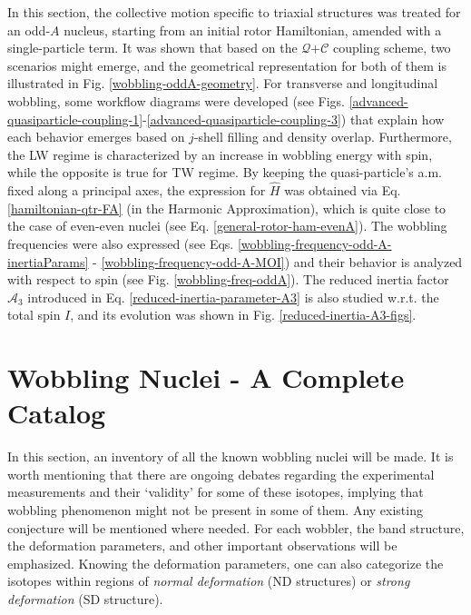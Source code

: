 In this section, the collective motion specific to triaxial structures was treated for an odd-$A$ nucleus, starting from an initial rotor Hamiltonian, amended with a single-particle term. It was shown that based on the $\mathcal{Q}$+$\mathscr{C}$ coupling scheme, two scenarios might emerge, and the geometrical representation for both of them is illustrated in Fig. \ref{wobbling-oddA-geometry}. For transverse and longitudinal wobbling, some workflow diagrams were developed (see Figs. \ref{advanced-quasiparticle-coupling-1}-\ref{advanced-quasiparticle-coupling-3}) that explain how each behavior emerges based on $j$-shell filling and density overlap. Furthermore, the LW regime is characterized by an increase in wobbling energy with spin, while the opposite is true for TW regime. By keeping the quasi-particle's a.m. fixed along a principal axes, the expression for $\hat{H}$ was obtained via Eq. \ref{hamiltonian-qtr-FA} (in the Harmonic Approximation), which is quite close to the case of even-even nuclei (see Eq. \ref{general-rotor-ham-evenA}). The wobbling frequencies were also expressed (see Eqs. \ref{wobbling-frequency-odd-A-inertiaParams} - \ref{wobbling-frequency-odd-A-MOI}) and their behavior is analyzed with respect to spin (see Fig. \ref{wobbling-freq-oddA}). The reduced inertia factor $\mathscr{A}_3$ introduced in Eq. \ref{reduced-inertia-parameter-A3} is also studied w.r.t. the total spin $I$, and its evolution was shown in Fig. \ref{reduced-inertia-A3-figs}.

\section{Wobbling Nuclei - A Complete Catalog}

In this section, an inventory of all the known wobbling nuclei will be made. It is worth mentioning that there are ongoing debates regarding the experimental measurements and their `validity' for some of these isotopes, implying that wobbling phenomenon might not be present in some of them. Any existing conjecture will be mentioned where needed. For each wobbler, the band structure, the deformation parameters, and other important observations will be emphasized. Knowing the deformation parameters, one can also categorize the isotopes within regions of \emph{normal deformation} (ND structures) or \emph{strong deformation} (SD structure).

